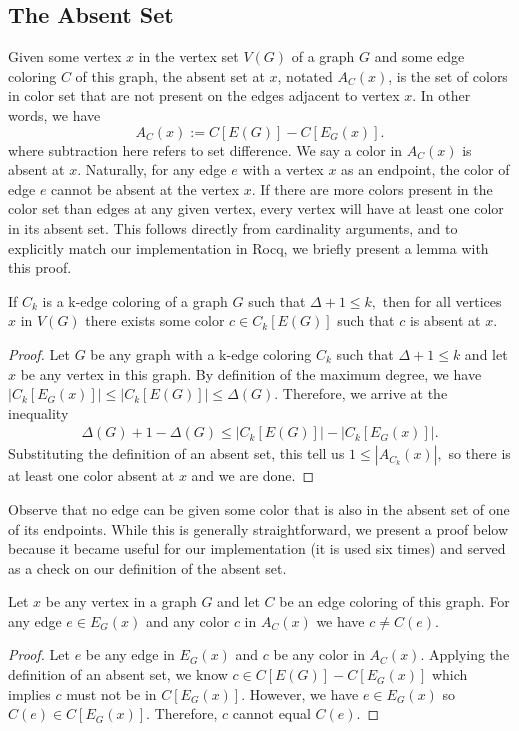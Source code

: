 \subsection{The Absent Set}
Given some vertex $x$ in the vertex set $V(G)$ of a graph $G$ and some edge coloring $C$ of this graph, the absent set at $x$, notated $A_C(x)$, is the set of colors in color set that are not present on the edges adjacent to vertex $x.$ In other words, we have 
\begin{equation*}
    A_C(x) := C[E(G)] - C[E_G(x)].
\end{equation*}
where subtraction here refers to set difference. We say a color in $A_C(x)$ is absent at $x$. Naturally, for any edge $e$ with a vertex $x$ as an endpoint, the color of edge $e$ cannot be absent at the vertex $x.$ If there are more colors present in the color set than edges at any given vertex, every vertex will have at least one color in its absent set. This follows directly from cardinality arguments, and to explicitly match our implementation in Rocq, we briefly present a lemma with this proof.
\begin{lemma}\label{exists_absent_color}
    If $C_k$ is a k-edge coloring of a graph $G$ such that $\Delta + 1 \leq k,$ then for all vertices $x$ in $V(G)$ there exists some color $c \in C_k[E(G)]$ such that $c$ is absent at $x$.
\end{lemma} 
\begin{proof}
    Let $G$ be any graph with a k-edge coloring $C_k$ such that $\Delta + 1 \leq k$ and let $x$ be any vertex in this graph. By definition of the maximum degree, we have $|C_k[E_G(x)]| \leq |C_k[E(G)]| \leq \Delta(G).$ Therefore, we arrive at the inequality
    \begin{align*}
        \Delta(G) + 1 - \Delta(G) \leq |C_k[E(G)]| - |C_k[E_G(x)]|.
    \end{align*}
    Substituting the definition of an absent set, this tell us $1 \leq |A_{C_k}(x)|,$ so there is at least one color absent at $x$ and we are done.
\end{proof}

Observe that no edge can be given some color that is also in the absent set of one of its endpoints. While this is generally straightforward, we present a proof below because it became useful for our implementation (it is used six times) and served as a check on our definition of the absent set.
\begin{lemma}\label{absent_edge}
    Let $x$ be any vertex in a graph $G$ and let $C$ be an edge coloring of this graph. For any edge $e \in E_G(x)$ and any color $c$ in $A_C(x)$ we have $c \neq C(e).$
\end{lemma}
\begin{proof}
    Let $e$ be any edge in $E_G(x)$ and $c$ be any color in $A_C(x).$ Applying the definition of an absent set, we know $c \in C[E(G)] - C[E_G(x)]$ which implies $c$ must not be in $C[E_G(x)].$ However, we have $e \in E_G(x)$ so $C(e) \in C[E_G(x)].$ Therefore, $c$ cannot equal $C(e).$
\end{proof}

